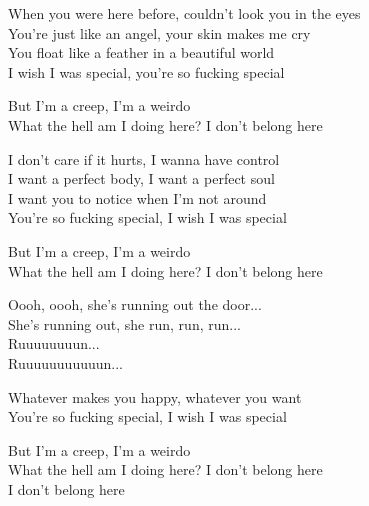 
\ve{}
When you were here before, couldn't look you in the eyes\\
You're just like an angel, your skin makes me cry\\
You float like a feather in a beautiful world\\
I wish I was special, you're so fucking special

\cho{}
But I'm a creep, I'm a weirdo\\
What the hell am I doing here? I don't belong here

\ve{}
I don't care if it hurts, I wanna have control\\
I want a perfect body, I want a perfect soul\\
I want you to notice when I'm not around\\
You're so fucking special, I wish I was special

\cho{}
But I'm a creep, I'm a weirdo\\
What the hell am I doing here? I don't belong here

Oooh, oooh, she's running out the door...\\
She's running out, she run, run, run...\\
Ruuuuuuuun...\\
Ruuuuuuuuuuun...

\ve{}
Whatever makes you happy, whatever you want\\
You're so fucking special, I wish I was special

\cho{}
But I'm a creep, I'm a weirdo\\
What the hell am I doing here? I don't belong here\\
I don't belong here

\esong{}
